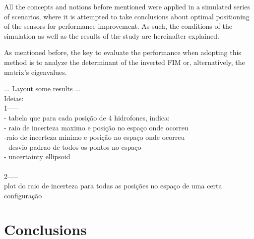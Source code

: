 All the concepts and notions before mentioned were applied in a simulated series of scenarios, where it is attempted to take conclusions about optimal positioning of the sensors for performance improvement. As such, the conditions of the simulation as well as the results of the study are hereinafter explained.

As mentioned before, the key to evaluate the performance when adopting this method is to analyze the determinant of the inverted FIM or, alternatively, the matrix's eigenvalues.




... Layout some results ... 
\\
Ideias:
\\
1-----
\\
- tabela que para cada posição de 4 hidrofones, indica:
\\
- raio de incerteza maximo e posição no espaço onde ocorreu
\\
-raio de incerteza minimo e posição no espaço onde ocorreu
\\
- desvio padrao de todos os pontos no espaço
\\
- uncertainty ellipsoid 
\\
\\
2-----
\\
plot do raio de incerteza para todas as posições no espaço de uma certa configuração



\section{Conclusions}

